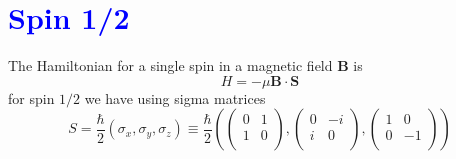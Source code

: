 \chapter{\textcolor{blue}{Spin 1/2}}
The Hamiltonian for a single spin in a magnetic field $\mathbf B$ is
\begin{equation}
    H=-\mu\mathbf B \cdot \mathbf S
\end{equation} 
for spin $1/2$ we have using sigma matrices
\begin{equation}
    S=\frac{\hbar}{2}\left(\sigma_x,\sigma_y,\sigma_z\right) \equiv \frac{\hbar}{2}\left(\left(
\begin{array}{cc}
 0 & 1 \\
 1 & 0 \\
\end{array}
\right),\left(
\begin{array}{cc}
 0 & -i \\
 i & 0 \\
\end{array}
\right),\left(
\begin{array}{cc}
 1 & 0 \\
 0 & -1 \\
\end{array}
\right)\right)
\end{equation}

